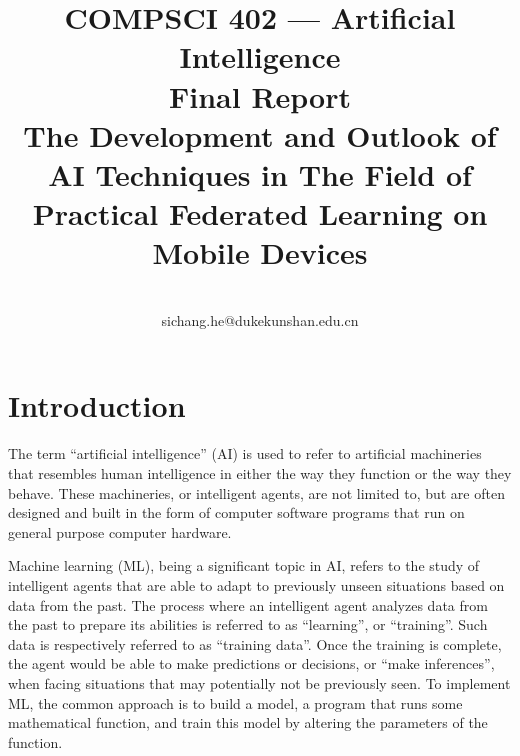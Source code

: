 \documentclass[conference]{IEEEtran}
\begin{document}
\title{
    COMPSCI 402 --- Artificial Intelligence\\
    Final Report\\
    The Development and Outlook of AI Techniques in The Field of
    Practical Federated Learning on Mobile Devices
}

\author{
    \\
    sichang.he@dukekunshan.edu.cn
}

\maketitle

\begin{abstract}
\end{abstract}

\section{Introduction}


The term ``artificial intelligence'' (AI) is used to refer to
artificial machineries that
resembles human intelligence in either the way they function or
the way they behave.
These machineries, or intelligent agents,
are not limited to,
but are often designed and built in the form of computer software programs that
run on general purpose computer hardware.

Machine learning (ML), being a significant topic in AI,
refers to the study of intelligent agents that are able to
adapt to previously unseen situations based on data from the past.
The process where an intelligent agent analyzes data from the past to
prepare its abilities is referred to as ``learning'', or ``training''.
Such data is respectively referred to as ``training data''.
Once the training is complete,
the agent would be able to make predictions or decisions,
or ``make inferences'',
when facing situations that may potentially not be previously seen.
To implement ML, the common approach is to build a model,
a program that runs some mathematical function,
and train this model by altering the parameters of the function.

\end{document}
